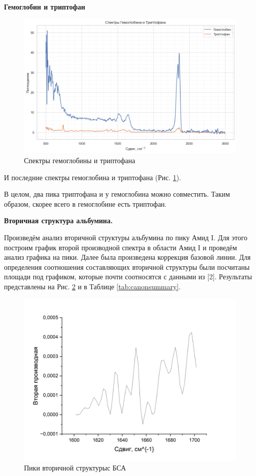 \documentclass{article}
\begin{document}
\textbf{Гемоглобин и триптофан}

\begin{figure}[h!]
\centering
    \includegraphics[width=0.7\linewidth]{Images/Гемоглобин и Триптофан.png}
    \caption{Спектры гемоглобины и триптофана}
    \label{гемоглобин и Триптофан}
\end{figure}

И последние спектры гемоглобина и триптофана (Рис. \ref{гемоглобин и Триптофан}).

В целом, два пика триптофана и у гемоглобина можно совместить. Таким образом, скорее всего в гемоглобине есть триптофан.

\textbf{Вторичная структура альбумина.}

Произведём анализ вторичной структуры альбумина по пику Амид I. Для этого построим график второй производной спектра в области Амид I и проведём анализ графика на пики. Далее была произведена коррекция базовой линии. Для определения соотношения составляющих вторичной структуры были посчитаны площади под графиком, которые почти соотносятся с данными из [2]. Результаты представлены на Рис. \ref{вторичная структура} и в Таблице \ref{tab:canonsummary}.

\begin{figure}[h!]
\centering
    \includegraphics[width=0.7\linewidth]{Images/Вторичная структура БСА.png}
    \caption{Пики вторичной структурыс БСА}
    \label{вторичная структура}
\end{figure}
\end{document}
